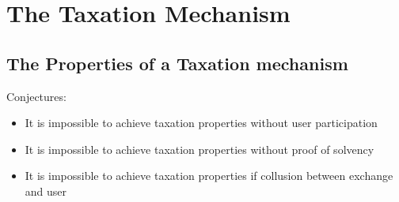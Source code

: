 \section{The Taxation Mechanism}\label{sec:taxation}

\subsection{The Properties of a Taxation mechanism}\label{subsec:taxation-properties}

Conjectures:
\begin{itemize}
    \item It is impossible to achieve taxation properties without user participation
    \item It is impossible to achieve taxation properties without proof of solvency
    \item It is impossible to achieve taxation properties if collusion between exchange and user
\end{itemize}
